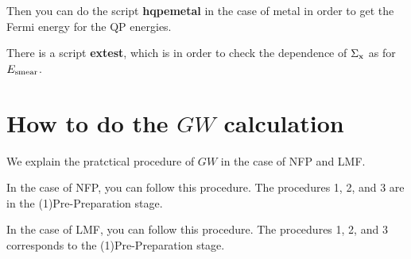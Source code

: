 \documentclass[a4paper,10pt,epsf,fleqn]{article}
\begin{document}
{\begin{itemize}
\end{itemize}
\vspace{.5cm}

Then you can do the script {\bf hqpemetal} in the case of metal in order to get 
the Fermi energy for the QP energies.

There is a script {\bf extest}, which is in order to check the dependence of
$\Sigma_{\rm x}$ as for $E_{\rm smear}$.



\newpage
\section{How to do the $GW$ calculation}
\noindent We explain the pratctical procedure of $GW$ in the case of NFP and LMF.
\vspace{.5cm}

\noindent In the case of NFP, you can follow this procedure.
The procedures 1, 2, and 3 are in the (1)Pre-Preparation stage.

\noindent{}


\vspace{0.7cm}


\noindent In the case of LMF, you can follow this procedure.
The procedures 1, 2, and 3 corresponds to the (1)Pre-Preparation stage.

\noindent{}}
\end{document}
